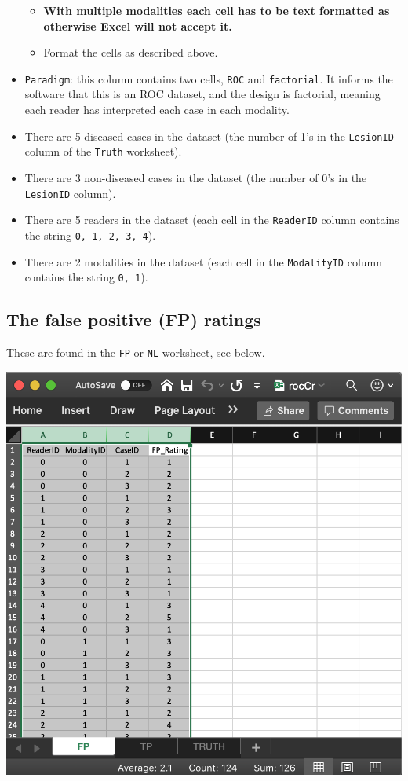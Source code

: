 \documentclass[
]{book}
\providecommand{\tightlist}{%
  \setlength{\itemsep}{0pt}\setlength{\parskip}{0pt}}
\begin{document}
\begin{itemize}
  \begin{itemize}
  \tightlist
  \item
    \textbf{With multiple modalities each cell has to be text formatted as otherwise Excel will not accept it.}
  \item
    Format the cells as described above.
  \end{itemize}
\item
  \texttt{Paradigm}: this column contains two cells, \texttt{ROC} and \texttt{factorial}. It informs the software that this is an ROC dataset, and the design is factorial, meaning each reader has interpreted each case in each modality.
\item
  There are 5 diseased cases in the dataset (the number of 1's in the \texttt{LesionID} column of the \texttt{Truth} worksheet).
\item
  There are 3 non-diseased cases in the dataset (the number of 0's in the \texttt{LesionID} column).
\item
  There are 5 readers in the dataset (each cell in the \texttt{ReaderID} column contains the string \texttt{0,\ 1,\ 2,\ 3,\ 4}).
\item
  There are 2 modalities in the dataset (each cell in the \texttt{ModalityID} column contains the string \texttt{0,\ 1}).
\end{itemize}

\hypertarget{quick-start-data-fp-worksheet}{%
\subsection{The false positive (FP) ratings}\label{quick-start-data-fp-worksheet}}

These are found in the \texttt{FP} or \texttt{NL} worksheet, see below.

\includegraphics[width=1\textwidth,height=\textheight]{images/quick-start/rocCrFp.png}
\end{document}
